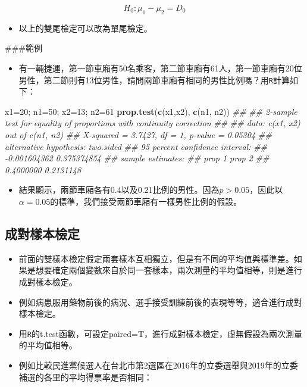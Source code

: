 \documentclass[hyperref,]{ctexart}
\newenvironment{Shaded}{\begin{snugshade}}{\end{snugshade}}
\newcommand{\CommentTok}[1]{\textcolor[rgb]{0.56,0.35,0.01}{\textit{#1}}}
\newcommand{\DecValTok}[1]{\textcolor[rgb]{0.00,0.00,0.81}{#1}}
\newcommand{\KeywordTok}[1]{\textcolor[rgb]{0.13,0.29,0.53}{\textbf{#1}}}
\newcommand{\NormalTok}[1]{#1}
\providecommand{\tightlist}{%
  \setlength{\itemsep}{0pt}\setlength{\parskip}{0pt}}
\begin{document}
\[H_{0}:\mu_{1}-\mu_{2}=D_{0}\]

\begin{itemize}
\tightlist
\item
  以上的雙尾檢定可以改為單尾檢定。
\end{itemize}

\#\#\#範例

\begin{itemize}
\tightlist
\item
  有一輛捷運，第一節車廂有50名乘客，第二節車廂有61人，第一節車廂有20位男性，第二節則有13位男性，請問兩節車廂有相同的男性比例嗎？用\texttt{R}計算如下：
\end{itemize}

\begin{Shaded}
\begin{Highlighting}[]
\NormalTok{x1=}\DecValTok{20}\NormalTok{; n1=}\DecValTok{50}\NormalTok{; x2=}\DecValTok{13}\NormalTok{; n2=}\DecValTok{61}
\KeywordTok{prop.test}\NormalTok{(}\KeywordTok{c}\NormalTok{(x1,x2), }\KeywordTok{c}\NormalTok{(n1, n2))}
\CommentTok{## }
\CommentTok{##  2-sample test for equality of proportions with continuity correction}
\CommentTok{## }
\CommentTok{## data:  c(x1, x2) out of c(n1, n2)}
\CommentTok{## X-squared = 3.7427, df = 1, p-value = 0.05304}
\CommentTok{## alternative hypothesis: two.sided}
\CommentTok{## 95 percent confidence interval:}
\CommentTok{##  -0.001604362  0.375374854}
\CommentTok{## sample estimates:}
\CommentTok{##    prop 1    prop 2 }
\CommentTok{## 0.4000000 0.2131148}
\end{Highlighting}
\end{Shaded}

\begin{itemize}
\tightlist
\item
  結果顯示，兩節車廂各有0.4以及0.21比例的男性。因為\(p>0.05\)，因此以\(\alpha=0.05\)的標準，我們接受兩節車廂有一樣男性比例的假設。
\end{itemize}

\hypertarget{ux6210ux5c0dux6a23ux672cux6aa2ux5b9a}{%
\subsection{成對樣本檢定}\label{ux6210ux5c0dux6a23ux672cux6aa2ux5b9a}}

\begin{itemize}
\item
  前面的雙樣本檢定假定兩套樣本互相獨立，但是有不同的平均值與標準差。如果是想要確定兩個變數來自於同一套樣本，兩次測量的平均值相等，則是進行成對樣本檢定。
\item
  例如病患服用藥物前後的病況、選手接受訓練前後的表現等等，適合進行成對樣本檢定。
\item
  用\texttt{R}的t.test函數，可設定paired=T，進行成對樣本檢定，虛無假設為兩次測量的平均值相等。
\item
  例如比較民進黨候選人在台北市第2選區在2016年的立委選舉與2019年的立委補選的各里的平均得票率是否相同：
\end{itemize}
\end{document}

